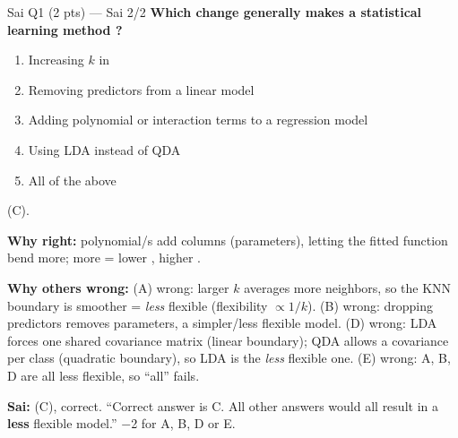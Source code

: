 \begin{qbox}{Sai Q1 (2 pts) --- Sai 2/2}
\textbf{Which change generally makes a statistical learning method ?}
\begin{enumerate}[label=(\Alph*),leftmargin=1.6em,itemsep=0pt]
\item Increasing $k$ in 
\item Removing predictors from a linear model
\item Adding polynomial or interaction terms to a regression model
\item Using LDA instead of QDA
\item All of the above
\end{enumerate}
\ans (C).
\par\textbf{Why right:} polynomial/s add columns (parameters), letting the fitted  function bend more; more
 = lower , higher . 
\par\textbf{Why others wrong:}
(A) wrong: larger $k$ averages more neighbors, so the KNN boundary is smoother = \emph{less} flexible (flexibility $\propto 1/k$).
(B) wrong: dropping predictors removes parameters, a simpler/less flexible model.
(D) wrong: LDA forces one shared covariance matrix (linear boundary); QDA allows a covariance per class (quadratic boundary), so LDA is the \emph{less} flexible one.
(E) wrong: A, B, D are all less flexible, so ``all'' fails.
\par\textbf{\color{dblue}Sai:} (C), correct. \grader ``Correct answer is C. All other answers would all result in a \textbf{less} flexible model.'' $-$2 for A, B, D or E.
\end{qbox}

